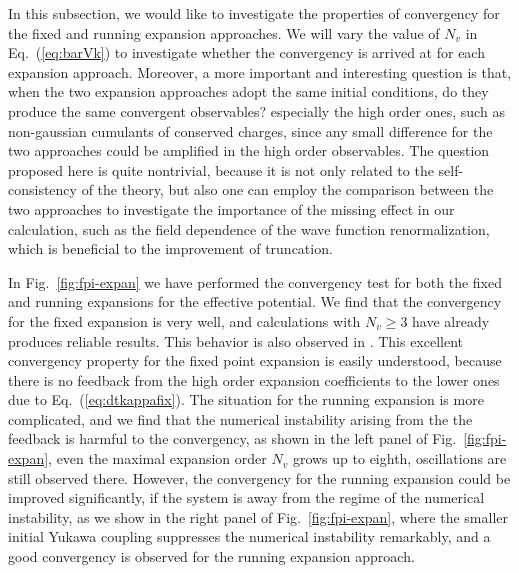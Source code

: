 \documentclass[%
reprint,
superscriptaddress,
showpacs,preprintnumbers,
 amsmath,amssymb,
 aps,
prd,
]{revtex4-1}
\def\Fig#1{Fig.~\ref{#1}} \def\Tab#1{Tab.~\ref{#1}}
\def\Eq#1{Eq.~(\ref{#1})}
\begin{document}
In this subsection, we would like to investigate the properties of convergency for the fixed and running expansion approaches. We will vary the value of $N_v$ in \Eq{eq:barVk} to investigate whether the convergency is arrived at for each expansion approach. Moreover, a more important and interesting question is that, when the two expansion approaches adopt the same initial conditions, do they produce the same convergent observables? especially the high order ones, such as non-gaussian cumulants of conserved charges, since any small difference for the two approaches could be amplified in the high order observables. The question proposed here is quite nontrivial, because it is not only related to the self-consistency of the theory, but also one can employ the comparison between the two approaches to investigate the importance of the missing effect in our calculation, such as the field dependence of the wave function renormalization, which is beneficial to the improvement of truncation. 

In \Fig{fig:fpi-expan} we have performed the convergency test for both the fixed and running expansions for the effective potential. We find that the convergency for the fixed expansion is very well, and calculations with $N_v\geq 3$ have already produces reliable results. This behavior is also observed in \cite{Pawlowski:2014zaa}. This excellent convergency property for the fixed point expansion is easily understood, because there is no feedback from the high order expansion coefficients to the lower ones due to \Eq{eq:dtkappafix}. The situation for the running expansion is more complicated, and we find that the numerical instability arising from the the feedback is harmful to the convergency, as shown in the left panel of \Fig{fig:fpi-expan}, even the maximal expansion order $N_v$ grows up to eighth, oscillations are still observed there. However, the convergency for the running expansion could be improved significantly, if the system is away from the regime of the numerical instability, as we show in the right panel of \Fig{fig:fpi-expan}, where the smaller initial Yukawa coupling suppresses the numerical instability remarkably, and a good convergency is observed for the running expansion approach. 
\end{document}
